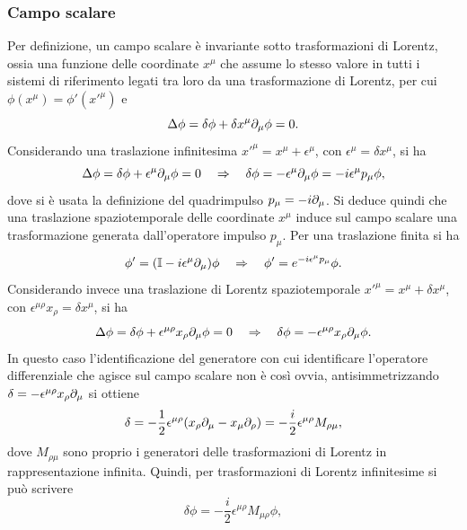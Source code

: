 \subsubsection{Campo scalare}
Per definizione, un campo scalare è invariante sotto trasformazioni di Lorentz, ossia una funzione delle coordinate $x^\mu$ che assume lo stesso valore in tutti i sistemi di riferimento legati tra loro da una trasformazione di Lorentz, per cui $\phi(x^\mu) = \phi'(x'^\mu)$ e
\begin{equation}
    \Delta \phi = \delta\phi + \delta x^\mu\partial_\mu\phi = 0.
\end{equation}
Considerando una traslazione infinitesima $x'^\mu = x^\mu + \epsilon^\mu$, con $\epsilon^\mu = \delta x^\mu$, si ha
\begin{equation}
    \Delta \phi = \delta \phi + \epsilon^\mu\partial_\mu\phi = 0\quad\Rightarrow\quad\delta\phi = -\epsilon^\mu\partial_\mu\phi = -i\epsilon^\mu p_\mu\phi,
\end{equation}
dove si è usata la definizione del quadrimpulso $p_\mu = -i\partial_\mu$. Si deduce quindi che una traslazione spaziotemporale delle coordinate $x^\mu$ induce sul campo scalare una trasformazione generata dall'operatore impulso $p_\mu$. Per una traslazione finita si ha
\begin{equation}
    \phi' = (\mathbb{I} - i\epsilon^\mu\partial_\mu)\phi\quad\Rightarrow\quad \phi' = e^{-i\epsilon^\mu p _\mu}\phi.
\end{equation}
Considerando invece una traslazione di Lorentz spaziotemporale $x'^\mu = x^\mu + \delta x^\mu$, con $ \epsilon^{\mu\rho}x_\rho = \delta x^\mu$, si ha
\begin{equation}
    \Delta \phi = \delta \phi + \epsilon^{\mu\rho}x_\rho\partial_\mu\phi = 0\quad\Rightarrow\quad\delta\phi = -\epsilon^{\mu\rho}x_\rho\partial_\mu\phi.
\end{equation}
In questo caso l'identificazione del generatore con cui identificare l'operatore differenziale che agisce sul campo scalare non è così ovvia, antisimmetrizzando $\delta = -\epsilon^{\mu\rho}x_\rho\partial_\mu$ si ottiene 
\begin{equation}
    \delta = -\frac{1}{2}\epsilon^{\mu\rho}(x_\rho\partial_\mu - x_\mu\partial_\rho) = -\frac{i}{2}\epsilon^{\mu\rho}M_{\rho\mu},
\end{equation}
dove $M_{\rho\mu}$ sono proprio i generatori delle trasformazioni di Lorentz in rappresentazione infinita. Quindi, per trasformazioni di Lorentz infinitesime si può scrivere
\begin{equation}
    \delta\phi = -\frac{i}{2}\epsilon^{\mu\rho}M_{\mu\rho}\phi,
\end{equation}
